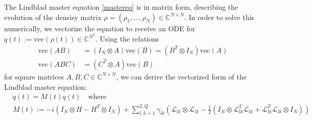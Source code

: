 \documentclass[letterpaper]{article}
\newcommand{\Ell}{\mathcal{L}}
\newcommand{\C}{\mathds{C}}
\begin{document}
  The Lindblad master equation \eqref{mastereq} is in matrix form, describing the evolution of the densisy matrix $\rho = (\rho_1, \dots, \rho_N) \in \C^{N\times N}$. In order to solve this numerically, we vectorize the equation to receive an ODE for $q(t) := \text{vec}(\rho(t)) \in \C^{N^2}$. Using the relations
  \begin{align}
   \text{vec}(AB) &= (I_N\otimes A)\text{vec}(B) = (B^T\otimes I_N)\text{vec}(A) \\
   \text{vec}(ABC) &= (C^T\otimes A)\text{vec}(B)
  \end{align}
  for square matrices $A,B,C\in\C^{N\times N}$, we can derive the vectorized form of the Lindblad master equation:
  \begin{align}\label{mastereq_vectorized}
    &\dot q(t) = M(t) q(t) \quad  \text{where} \\
    &M(t) := -i(I_N\otimes H - H^T \otimes I_N) + \sum_{l,k=1}^{2,Q} \gamma_{lk} \left( \Ell_{lk}\otimes \Ell_{lk} - \frac 1 2 \left( I_N\otimes \Ell^T_{lk}\Ell_{lk} + \Ell^T_{lk}\Ell_{lk} \otimes I_N \right) \right)
  \end{align}
\end{document}
